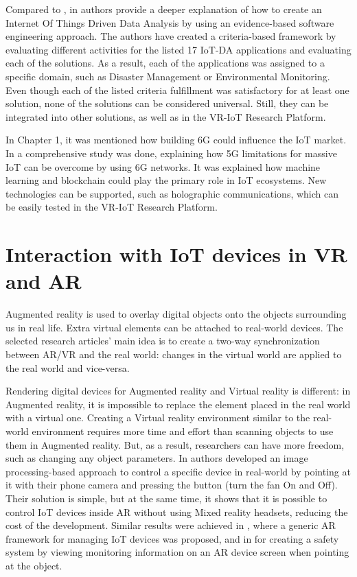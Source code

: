 Compared to \cite{k_mohapatra_solution_2016}, in \cite{ahmad_software_2021} authors provide a deeper explanation of how to create an Internet Of Things Driven Data Analysis by using an evidence-based software engineering approach. The authors have created a criteria-based framework by evaluating different activities for the listed 17 IoT-DA applications and evaluating each of the solutions. As a result, each of the applications was assigned to a specific domain, such as Disaster Management or Environmental Monitoring. Even though each of the listed criteria fulfillment was satisfactory for at least one solution, none of the solutions can be considered universal. Still, they can be integrated into other solutions, as well as in the VR-IoT Research Platform.

In Chapter 1, it was mentioned how building 6G could influence the IoT market. In \cite{guo_enabling_2021} a comprehensive study was done, explaining how 5G limitations for massive IoT can be overcome by using 6G networks. It was explained how machine learning and blockchain could play the primary role in IoT ecosystems. New technologies can be supported, such as holographic communications, which can be easily tested in the VR-IoT Research Platform.

\section{Interaction with IoT devices in VR and AR}

Augmented reality is used to overlay digital objects onto the objects surrounding us in real life. Extra virtual elements can be attached to real-world devices. The selected research articles' main idea is to create a two-way synchronization between AR/VR and the real world: changes in the virtual world are applied to the real world and vice-versa.

Rendering digital devices for Augmented reality and Virtual reality is different: in Augmented reality, it is impossible to replace the element placed in the real world with a virtual one. Creating a Virtual reality environment similar to the real-world environment requires more time and effort than scanning objects to use them in Augmented reality. But, as a result, researchers can have more freedom, such as changing any object parameters. 
In \cite{ankireddy_augmented_2019} authors developed an image processing-based approach to control a specific device in real-world by pointing at it with their phone camera and pressing the button (turn the fan On and Off). Their solution is simple, but at the same time, it shows that it is possible to control IoT devices inside AR without using Mixed reality headsets, reducing the cost of the development. Similar results were achieved in \cite{jo_-situ_2016}, where a generic AR framework for managing IoT devices was proposed, and in \cite{alam_augmented_2017} for creating a safety system by viewing monitoring information on an AR device screen when pointing at the object.

